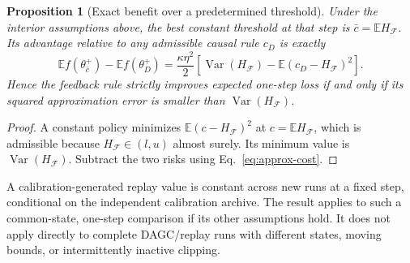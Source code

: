 \documentclass{article}
\newtheorem{proposition}{Proposition}
\begin{document}
\begin{proposition}[Exact benefit over a predetermined threshold]
Under the interior assumptions above, the best constant threshold at that
step is $\bar c=\mathbb E H_{\mathcal F}$. Its advantage relative to any
admissible causal rule $c_D$ is exactly
\begin{equation}
 \mathbb E f(\theta_{\bar c}^+)-\mathbb E f(\theta_D^+)
 =\frac{\kappa\eta^2}{2}
 \left[\operatorname{Var}(H_{\mathcal F})
       -\mathbb E(c_D-H_{\mathcal F})^2\right].
 \label{eq:feedback-gain}
\end{equation}
Hence the feedback rule strictly improves expected one-step loss if and only
if its squared approximation error is smaller than
$\operatorname{Var}(H_{\mathcal F})$.
\end{proposition}
\begin{proof}
A constant policy minimizes
$\mathbb E(c-H_{\mathcal F})^2$ at $c=\mathbb E H_{\mathcal F}$, which
is admissible because $H_{\mathcal F}\in(l,u)$ almost surely.
Its minimum value is $\operatorname{Var}(H_{\mathcal F})$. Subtract the
two risks using Eq.~\eqref{eq:approx-cost}.
\end{proof}
A calibration-generated replay value is constant across new runs at a fixed
step, conditional on the independent calibration archive. The result applies
to such a common-state, one-step comparison if its other assumptions hold.
It does not apply directly to complete DAGC/replay runs with different states,
moving bounds, or intermittently inactive clipping.
\end{document}
